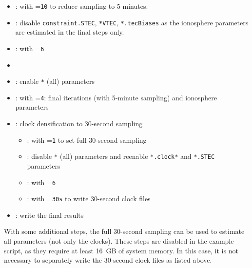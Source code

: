\begin{itemize}
      \item {}: with =\verb|10| to reduce sampling to 5 minutes.
      \item {}:
            disable \verb|constraint.STEC|, \verb|*VTEC|, \verb|*.tecBiases| as the ionosphere parameters are estimated in the final steps only.
      \item {}: with =\verb|6|
      \item {}
      \item {}:
            enable \verb|*| (all) parameters
      \item {}: with =\verb|4|: final iterations (with 5-minute sampling) and ionosphere parameters
      \item {}: clock densification to 30-second sampling
      \begin{itemize}
            \item {}: with =\verb|1| to set full 30-second sampling
            \item {}:
            disable \verb|*| (all) parameters and reenable \verb|*.clock*| and \verb|*.STEC| parameters
            \item {}: with =\verb|6|
            \item {}: with =\verb|30s| to write 30-second clock files
      \end{itemize}
      \item {}: write the final results
\end{itemize}

With some additional steps, the full 30-second sampling can be used to estimate all parameters (not only the clocks).
These steps are disabled in the example script, as they require at least 16~GB of system memory.
In this case, it is not necessary to separately write the 30-second clock files as listed above.

